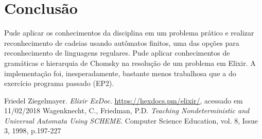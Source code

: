 \documentclass[conference]{IEEEtran}
\begin{document}
\section{Conclusão}

Pude aplicar os conhecimentos da disciplina em um problema prático e realizar reconhecimento de cadeias usando autômatos finitos, uma das opções para reconhecimento de linguagens regulares. Pude aplicar conhecimentos de gramáticas e hierarquia de Chomsky na resolução de um problema em Elixir. A implementação foi, inesperadamente, bastante menos trabalhosa que a do exercício programa passado (EP2).

\begin{thebibliography}{1}
Friedel Ziegelmayer. \emph{Elixir ExDoc}. \url{https://hexdocs.pm/elixir/}, acessado em 11/02/2018
Wagenknecht, C., Friedman, P.D. \emph{Teaching Nondeterministic and Universal Automata Using SCHEME}. Computer Science Education, vol. 8, Issue 3, 1998, p.197-227
\end{thebibliography}
\end{document}

